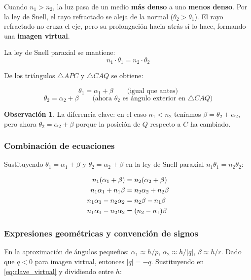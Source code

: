 \documentclass[12pt, a4paper]{article}
\theoremstyle{definition}
\newtheorem{observacion}{Observación}[section]
\begin{document}
Cuando \(n_1 > n_2\), la luz pasa de un medio \textbf{más denso} a uno \textbf{menos
denso}. Por la ley de Snell, el rayo refractado se aleja de la normal
(\(\theta_2 > \theta_1\)). El rayo refractado no cruza el eje, pero su prolongación hacia
atrás sí lo hace, formando una \textbf{imagen virtual}.

La ley de Snell paraxial se mantiene:
\[
  n_1 \cdot \theta_1 = n_2 \cdot \theta_2
\]

De los triángulos \(\triangle APC\) y \(\triangle CAQ\) se obtiene:

\[
  \theta_1 = \alpha_1 + \beta \qquad\text{(igual que antes)}
\]
\[
  \theta_2 = \alpha_2 + \beta \qquad\text{(ahora \(\theta_2\) es ángulo exterior en
  \(\triangle CAQ\))}
\]

\begin{observacion}
La diferencia clave: en el caso \(n_1 < n_2\) teníamos \(\beta = \theta_2 + \alpha_2\),
pero ahora \(\theta_2 = \alpha_2 + \beta\) porque la posición de \(Q\) respecto a \(C\)
ha cambiado.
\end{observacion}

\subsubsection*{Combinación de ecuaciones}

Sustituyendo \(\theta_1 = \alpha_1 + \beta\) y \(\theta_2 = \alpha_2 + \beta\) en la ley
de Snell paraxial \(n_1\theta_1 = n_2\theta_2\):

\begin{align}
  n_1(\alpha_1 + \beta) &= n_2(\alpha_2 + \beta) \notag \\
  n_1\alpha_1 + n_1\beta &= n_2\alpha_2 + n_2\beta \notag \\
  n_1\alpha_1 - n_2\alpha_2 &= n_2\beta - n_1\beta \notag \\
  n_1\alpha_1 - n_2\alpha_2 &= (n_2 - n_1)\beta
  \label{eq:clave_virtual}
\end{align}

\subsubsection*{Expresiones geométricas y convención de signos}

En la aproximación de ángulos pequeños: \(\alpha_1 \approx h/p\), \(\alpha_2 \approx
h/|q|\), \(\beta \approx h/r\). Dado que \(q < 0\) para imagen virtual, entonces
\(|q| = -q\). Sustituyendo en \eqref{eq:clave_virtual} y dividiendo entre \(h\):
\end{document}
